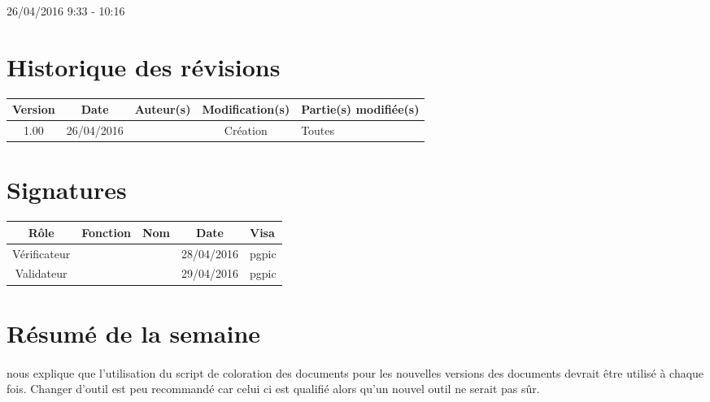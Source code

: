 \documentclass [a4paper] {article}
\begin{document}
\rhead{}

26/04/2016
\hfill   
\hfill 	9:33 - 10:16 				%



\section*{Historique des révisions}
\begin{center}
			\begin{tabular}{| c | c | c | c | p{4cm} |}
				\hline
				\rowcolor{Gray}
				Version & Date & Auteur(s) & Modification(s) & Partie(s) modifiée(s)		 \\
				\hline
				1.00 & 26/04/2016 & \Pierre & Création & Toutes \\
		\hline		
			\end{tabular}
		\end{center}

\section*{Signatures}

		\begin{center}
			\begin{tabular}{| c | c | c | c | p{4cm} |}
				\hline
				\rowcolor{Gray}
				Rôle & Fonction & Nom & Date & Visa		 \\
				\hline
				Vérificateur & \RQA & \Kafui & 28/04/2016 & pgpic \\[30pt]
				\hline
				Validateur & \CP & \Sergi & 29/04/2016 & pgpic \\[30pt]	
				\hline
			\end{tabular}
		\end{center}


\section{Résumé de la semaine}
\paragraph*{}
\nomTuteurQualite{} nous explique que l'utilisation du script de coloration des documents pour les nouvelles versions des documents devrait être utilisé à chaque fois. Changer d'outil est peu recommandé car celui ci est qualifié alors qu'un nouvel outil ne serait pas sûr.
\end{document}
